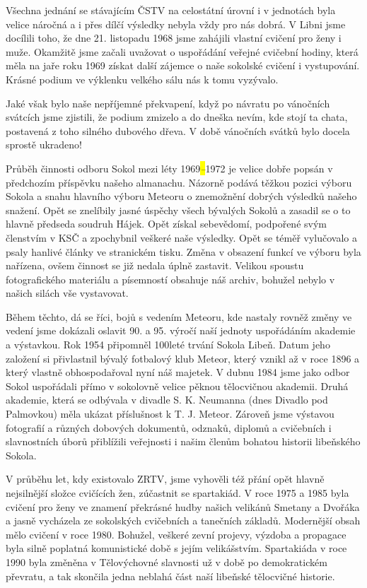 Všechna jednání se stávajícím ČSTV na celostátní úrovní i v jednotách
byla velice náročná a i přes dílčí výsledky nebyla vždy pro nás dobrá. V
Libni jsme docílili toho, že dne 21. listopadu 1968 jsme zahájili
vlastní cvičení pro ženy i muže. Okamžitě jsme začali uvažovat o
uspořádání veřejné cvičební hodiny, která měla na jaře roku 1969 získat
další zájemce o naše sokolské cvičení i vystupování. Krásné podium ve
výklenku velkého sálu nás k tomu vyzývalo.

Jaké však bylo naše nepříjemné překvapení, když po návratu po vánočních
svátcích jsme zjistili, že podium zmizelo a do dneška nevím, kde stojí
ta chata, postavená z toho silného dubového dřeva. V době vánočních
svátků bylo docela sprostě ukradeno!

Průběh činnosti odboru Sokol mezi léty 1969\emph{\hl{--}}1972 je velice
dobře popsán v předchozím příspěvku našeho almanachu. Názorně podává
těžkou pozici výboru Sokola a snahu hlavního výboru Meteoru o znemožnění
dobrých výsledků našeho snažení. Opět se znelíbily jasné úspěchy všech
bývalých Sokolů a zasadil se o to hlavně předseda soudruh Hájek. Opět
získal sebevědomí, podpořené svým členstvím v KSČ a zpochybnil veškeré
naše výsledky. Opět se téměř vylučovalo a psaly hanlivé články ve
stranickém tisku. Změna v obsazení funkcí ve výboru byla nařízena, ovšem
činnost se již nedala úplně zastavit. Velikou spoustu fotografického
materiálu a písemností obsahuje náš archiv, bohužel nebylo v našich
silách vše vystavovat.

Během těchto, dá se říci, bojů s vedením Meteoru, kde nastaly rovněž
změny ve vedení jsme dokázali oslavit 90. a 95. výročí naší jednoty
uspořádáním akademie a výstavkou. Rok 1954 připomněl 100leté trvání
Sokola Libeň. Datum jeho založení si přivlastnil bývalý fotbalový klub
Meteor, který vznikl až v roce 1896 a který vlastně obhospodařoval nyní
náš majetek. V dubnu 1984 jsme jako odbor Sokol uspořádali přímo v
sokolovně velice pěknou tělocvičnou akademii. Druhá akademie, která se
odbývala v divadle S. K. Neumanna (dnes Divadlo pod Palmovkou) měla
ukázat příslušnost k T. J. Meteor. Zároveň jsme výstavou fotografií a
různých dobových dokumentů, odznaků, diplomů a cvičebních i slavnostních
úborů přiblížili veřejnosti i našim členům bohatou historii libeňského
Sokola.

V průběhu let, kdy existovalo ZRTV, jsme vyhověli též přání opět hlavně
nejsilnější složce cvičících žen, zúčastnit se spartakiád. V roce 1975 a
1985 byla cvičení pro ženy ve znamení překrásné hudby našich velikánů
Smetany a Dvořáka a jasně vycházela ze sokolských cvičebních a tanečních
základů. Modernější obsah mělo cvičení v roce 1980. Bohužel, veškeré
zevní projevy, výzdoba a propagace byla silně poplatná komunistické době
s jejím velikášstvím. Spartakiáda v roce 1990 byla změněna v
Tělovýchovné slavnosti už v době po demokratickém převratu, a tak
skončila jedna neblahá část naší libeňské tělocvičné historie.

